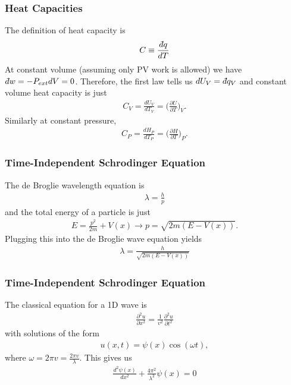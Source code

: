 \documentclass{beamer}
\newcommand{\dbar}{{d\mkern-7mu\mathchar'26\mkern-2mu}}
\newenvironment{noheadline}{
	\setbeamertemplate{headline}{}
	\addtobeamertemplate{frametitle}{\vspace*{-0.9\baselineskip}}{}
}{}
\begin{document}
\begin{noheadline}
\begin{frame}
\frametitle{Heat Capacities}
The definition of heat capacity is
\begin{align*}
C \equiv \frac{\dbar q}{dT}
\end{align*}
At constant volume (assuming only PV work is allowed) we have $\dbar w = -P_{ext} dV = 0$. Therefore, the first law tells us $dU_{V} = \dbar q_{V}$ and constant volume heat capacity is just
\begin{align*}
C_{V} = \frac{dU_{V}}{dT_{V}} = \bigg( \frac{\partial U}{\partial T} \bigg)_{V}.
\end{align*}
Similarly at constant pressure,
\begin{align*}
C_{P} = \frac{dH_{P}}{dT_{P}} = \bigg( \frac{\partial H}{\partial T} \bigg)_{P}.
\end{align*}
\end{frame}



\begin{frame}
\frametitle{Time-Independent Schrodinger Equation}
The de Broglie wavelength equation is
\begin{align*}
\lambda = \frac{h}{p}
\end{align*}
and the total energy of a particle is just
\begin{align*}
E = \frac{p^2}{2m} + V(x) \rightarrow p = \sqrt{2m (E - V(x))}.
\end{align*}
Plugging this into the de Broglie wave equation yields
\begin{align*}
 \lambda = \frac{h}{\sqrt{2m (E - V(x))}}
\end{align*}
\end{frame}

\begin{frame}
\frametitle{Time-Independent Schrodinger Equation}
The classical equation for a 1D wave is
\begin{align*}
\frac{\partial^2 u}{\partial x^2} = \frac{1}{v^2} \frac{\partial^2 u}{\partial t^2}
\end{align*}
with solutions of the form
\begin{align*}
u(x,t) = \psi(x) \cos (\omega t),
\end{align*}
where $\omega = 2\pi v = \frac{2 \pi v}{\lambda}$. This gives us
\begin{align*}
\frac{d^2 \psi(x)}{d x^2} + \frac{4 \pi^2}{\lambda^2}\psi(x) = 0
\end{align*}
\end{frame}


\end{noheadline}
\end{document}
